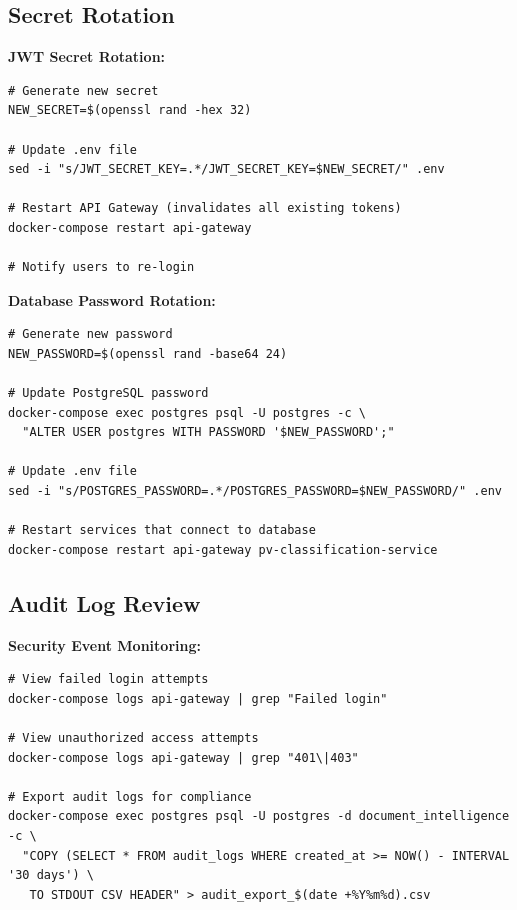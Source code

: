 \subsection{Secret Rotation}

\textbf{JWT Secret Rotation:}
\begin{commandbox}
\begin{lstlisting}[style=bashstyle]
# Generate new secret
NEW_SECRET=$(openssl rand -hex 32)

# Update .env file
sed -i "s/JWT_SECRET_KEY=.*/JWT_SECRET_KEY=$NEW_SECRET/" .env

# Restart API Gateway (invalidates all existing tokens)
docker-compose restart api-gateway

# Notify users to re-login
\end{lstlisting}
\end{commandbox}

\textbf{Database Password Rotation:}
\begin{commandbox}
\begin{lstlisting}[style=bashstyle]
# Generate new password
NEW_PASSWORD=$(openssl rand -base64 24)

# Update PostgreSQL password
docker-compose exec postgres psql -U postgres -c \
  "ALTER USER postgres WITH PASSWORD '$NEW_PASSWORD';"

# Update .env file
sed -i "s/POSTGRES_PASSWORD=.*/POSTGRES_PASSWORD=$NEW_PASSWORD/" .env

# Restart services that connect to database
docker-compose restart api-gateway pv-classification-service
\end{lstlisting}
\end{commandbox}

\subsection{Audit Log Review}

\textbf{Security Event Monitoring:}
\begin{commandbox}
\begin{lstlisting}[style=bashstyle]
# View failed login attempts
docker-compose logs api-gateway | grep "Failed login"

# View unauthorized access attempts
docker-compose logs api-gateway | grep "401\|403"

# Export audit logs for compliance
docker-compose exec postgres psql -U postgres -d document_intelligence -c \
  "COPY (SELECT * FROM audit_logs WHERE created_at >= NOW() - INTERVAL '30 days') \
   TO STDOUT CSV HEADER" > audit_export_$(date +%Y%m%d).csv
\end{lstlisting}
\end{commandbox}

